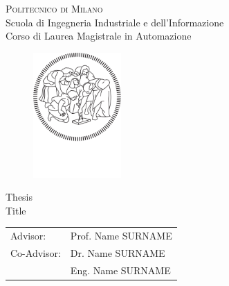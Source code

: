 \begin{titlepage}

\begin{center}
\Large{\textsc{Politecnico di Milano}}\\
\Large{Scuola di Ingegneria Industriale e dell'Informazione}\\
\large{Corso di Laurea Magistrale in Automazione}\\
\par
\par
\end{center}

\vspace{0.5cm}

\begin{center}
\begin{figure}[h!]
\centering{}
\includegraphics[width=0.3\textwidth]{title-page/logo-polimi-new}
\end{figure}
\vspace{1cm}
\par
\end{center}

\begin{center}
\LARGE{Thesis\\
Title}
\vspace{2cm}
\par
\end{center}

\begin{flushleft}
\begin{tabular}{ll}
Advisor:  & Prof. Name SURNAME\tabularnewline
Co-Advisor:  & Dr. Name SURNAME\tabularnewline %
			 & Eng. Name SURNAME\tabularnewline %
\end{tabular}\vspace{1cm}
\par
\end{flushleft}


\end{titlepage}
